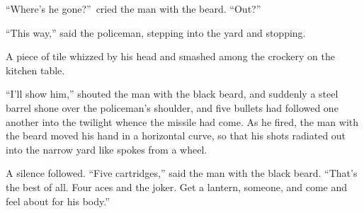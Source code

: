 “Where’s he gone?”\ cried the man with the beard. “Out?”

“This way,” said the policeman, stepping into the yard and stopping.

A piece of tile whizzed by his head and smashed among the crockery on the kitchen table.

“I’ll show him,” shouted the man with the black beard, and suddenly a steel barrel shone over the policeman’s shoulder, and five bullets had followed one another into the twilight whence the missile had come. As he fired, the man with the beard moved his hand in a horizontal curve, so that his shots radiated out into the narrow yard like spokes from a wheel.

A silence followed. “Five cartridges,” said the man with the black beard. “That’s the best of all. Four aces and the joker. Get a lantern, someone, and come and feel about for his body.”